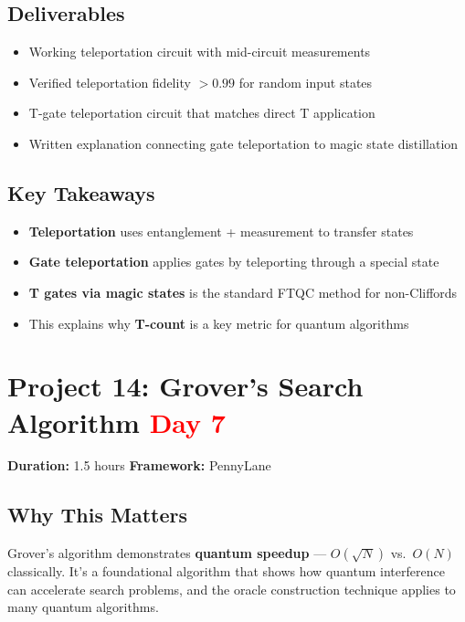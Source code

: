 \documentclass[11pt,a4paper]{article}
\begin{document}
\subsection*{Deliverables}
\begin{itemize}
    \item[\checkmark] Working teleportation circuit with mid-circuit measurements
    \item[\checkmark] Verified teleportation fidelity $>0.99$ for random input states
    \item[\checkmark] T-gate teleportation circuit that matches direct T application
    \item[\checkmark] Written explanation connecting gate teleportation to magic state distillation
\end{itemize}

\subsection*{Key Takeaways}
\begin{itemize}
    \item \textbf{Teleportation} uses entanglement + measurement to transfer states
    \item \textbf{Gate teleportation} applies gates by teleporting through a special state
    \item \textbf{T gates via magic states} is the standard FTQC method for non-Cliffords
    \item This explains why \textbf{T-count} is a key metric for quantum algorithms
\end{itemize}


\section{Project 14: Grover's Search Algorithm \hfill \textcolor{red}{\textbf{Day 7}}}

\begin{questionbox}
\textbf{Duration:} 1.5 hours \quad \textbf{Framework:} PennyLane
\end{questionbox}

\subsection*{Why This Matters}
Grover's algorithm demonstrates \textbf{quantum speedup} --- $O(\sqrt{N})$ vs.\ $O(N)$ classically. It's a foundational algorithm that shows how quantum interference can accelerate search problems,  and the oracle construction technique applies to many quantum algorithms.
\end{document}
